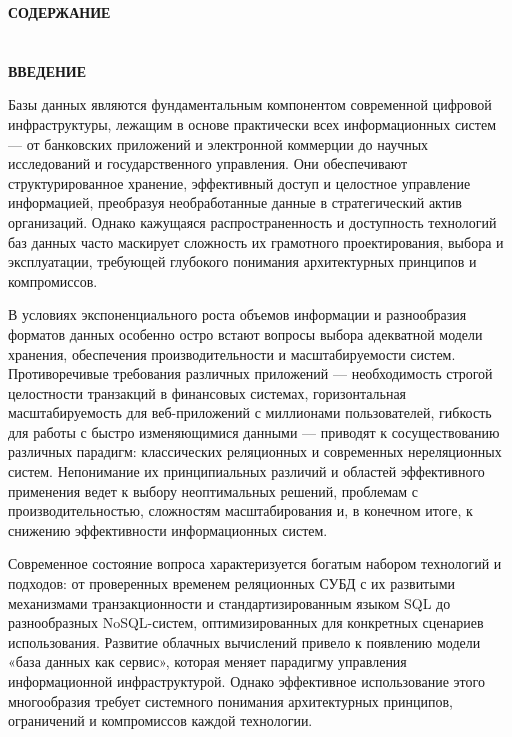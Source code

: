 \documentclass{SibFU-docs}
\begin{document}
\newpage

\thispagestyle{empty}
\begin{center}
\bfseries СОДЕРЖАНИЕ
\end{center}
\vspace{-6pt}
\tableofcontents
\clearpage

\section*{}
\vspace*{-2.5em}
\begin{center}\textbf{ВВЕДЕНИЕ}\end{center}
{}

Базы данных являются фундаментальным компонентом современной цифровой инфраструктуры, лежащим в основе практически всех информационных систем — от банковских приложений и электронной коммерции до научных исследований и государственного управления. Они обеспечивают структурированное хранение, эффективный доступ и целостное управление информацией, преобразуя необработанные данные в стратегический актив организаций. Однако кажущаяся распространенность и доступность технологий баз данных часто маскирует сложность их грамотного проектирования, выбора и эксплуатации, требующей глубокого понимания архитектурных принципов и компромиссов.

В условиях экспоненциального роста объемов информации и разнообразия форматов данных особенно остро встают вопросы выбора адекватной модели хранения, обеспечения производительности и масштабируемости систем. Противоречивые требования различных приложений — необходимость строгой целостности транзакций в финансовых системах, горизонтальная масштабируемость для веб-приложений с миллионами пользователей, гибкость для работы с быстро изменяющимися данными — приводят к сосуществованию различных парадигм: классических реляционных и современных нереляционных систем. Непонимание их принципиальных различий и областей эффективного применения ведет к выбору неоптимальных решений, проблемам с производительностью, сложностям масштабирования и, в конечном итоге, к снижению эффективности информационных систем.

Современное состояние вопроса характеризуется богатым набором технологий и подходов: от проверенных временем реляционных СУБД с их развитыми механизмами транзакционности и стандартизированным языком SQL до разнообразных NoSQL-систем, оптимизированных для конкретных сценариев использования. Развитие облачных вычислений привело к появлению модели «база данных как сервис», которая меняет парадигму управления информационной инфраструктурой. Однако эффективное использование этого многообразия требует системного понимания архитектурных принципов, ограничений и компромиссов каждой технологии.
\end{document}
